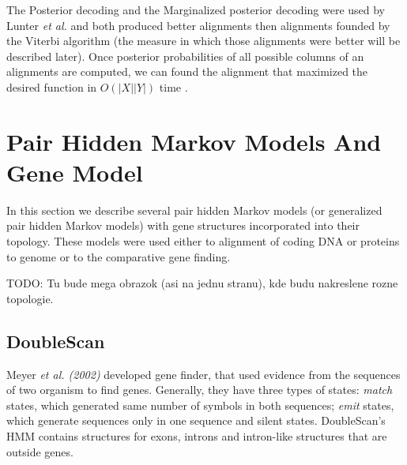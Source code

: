 The Posterior decoding and the Marginalized posterior decoding were used by
Lunter {\it et al.} and both produced better alignments then alignments founded
by the Viterbi algorithm (the measure in which those alignments were better will
be described later). Once posterior probabilities of all possible columns of an
alignments are computed, we can found the alignment that maximized the desired
function in $O(|X||Y|)$ time \cite{Lunter2008}. 



\section{Pair Hidden Markov Models And Gene Model}

In this section we describe several pair hidden Markov models (or generalized
pair hidden Markov models) with gene structures incorporated into their
topology. These models were used either to alignment of coding DNA or proteins
to genome or to the comparative gene finding.

TODO: Tu bude mega obrazok (asi na jednu stranu), kde budu nakreslene rozne
topologie.



\subsection{DoubleScan}
Meyer {\it et al. (2002)} developed gene finder, that used evidence from the
sequences of two organism to find genes. Generally,
they have three types of states: {\it match} states, which generated same number
of symbols in both sequences;   {\it emit} states, which generate sequences only
in one sequence and silent states. DoubleScan's HMM contains structures for
exons, introns and intron-like structures that are outside genes. 

